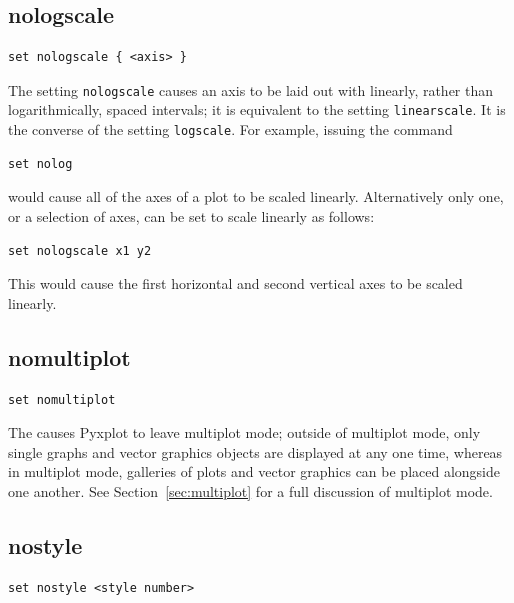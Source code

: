 \subsection{nologscale}

\begin{verbatim}
set nologscale { <axis> }
\end{verbatim}

The setting {\tt nologscale} causes an axis to be laid out with linearly,
rather than logarithmically, spaced intervals; it is equivalent to the setting
{\tt linearscale}. It is the converse of the setting {\tt logscale}.  For
example, issuing the command

\begin{verbatim}
set nolog
\end{verbatim}

\noindent would cause all of the axes of a plot to be scaled linearly.
Alternatively only one, or a selection of axes, can be set to scale linearly as
follows:

\begin{verbatim}
set nologscale x1 y2
\end{verbatim}

\noindent This would cause the first horizontal and second vertical axes to be
scaled linearly.


\subsection{nomultiplot}

\begin{verbatim}
set nomultiplot
\end{verbatim}

The  causes Pyxplot to leave multiplot mode; outside
of multiplot mode, only single graphs and vector graphics objects are displayed
at any one time, whereas in multiplot mode, galleries of plots and vector
graphics can be placed alongside one another.  See Section~\ref{sec:multiplot}
for a full discussion of multiplot mode.


\subsection{nostyle}

\begin{verbatim}
set nostyle <style number>
\end{verbatim}

